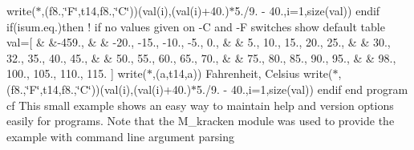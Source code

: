 \begin{DoxyCompactItemize}
write($\ast$,\textquotesingle{}(f8.,\char`\"{}\+F\char`\"{},t14,f8.,\char`\"{}\+C\char`\"{})\textquotesingle{})(val(i),(val(i)+40.)$\ast$5./9. -\/ 40.,i=1,size(val)) endif if(isum.\+eq.)then ! if no values given on -\/\+C and -\/\+F switches show default table val=\mbox{[} \& \&-\/459., \& \& -\/20., -\/15., -\/10., -\/5., 0., \& \& 5., 10., 15., 20., 25., \& \& 30., 32., 35., 40., 45., \& \& 50., 55., 60., 65., 70., \& \& 75., 80., 85., 90., 95., \& \& 98., 100., 105., 110., 115. \mbox{]} write($\ast$,\textquotesingle{}(a,t14,a)\textquotesingle{}) \textquotesingle{}\+Fahrenheit\textquotesingle{}, \textquotesingle{}\+Celsius\textquotesingle{} write($\ast$,\textquotesingle{}(f8.,\char`\"{}\+F\char`\"{},t14,f8.,\char`\"{}\+C\char`\"{})\textquotesingle{})(val(i),(val(i)+40.)$\ast$5./9. -\/ 40.,i=1,size(val)) endif end program cf This small example shows an easy way to maintain help and version options easily for programs. Note that the M\+\_\+kracken module was used to provide the example with command line argument parsing
\end{DoxyCompactItemize}
